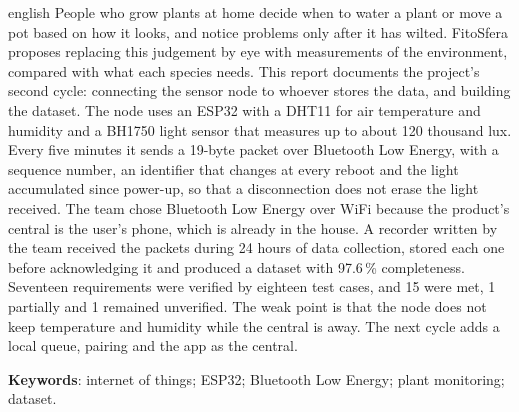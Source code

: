 \begin{resumo}[Abstract]
\begin{otherlanguage*}{english}
People who grow plants at home decide when to water a plant or move a pot
based on how it looks, and notice problems only after it has wilted.
FitoSfera proposes replacing this judgement by eye with measurements of
the environment, compared with what each species needs. This report
documents the project's second cycle: connecting the sensor node to
whoever stores the data, and building the dataset. The node uses an ESP32
with a DHT11 for air temperature and humidity and a BH1750 light sensor
that measures up to about 120 thousand lux. Every five minutes it sends a
19-byte packet over Bluetooth Low Energy, with a sequence number, an
identifier that changes at every reboot and the light accumulated since
power-up, so that a disconnection does not erase the light received. The
team chose Bluetooth Low Energy over WiFi because the product's central
is the user's phone, which is already in the house. A recorder written by
the team received the packets during 24 hours of data
collection, stored each one before acknowledging it and produced a
dataset with 97.6\,\% completeness. Seventeen requirements were
verified by eighteen test cases, and 15 were met, 1 partially and 1 remained unverified. The weak point
is that the node does not keep temperature and humidity while the central
is away. The next cycle adds a local queue, pairing and the app as the
central.

\textbf{Keywords}: internet of things; ESP32; Bluetooth Low Energy; plant
monitoring; dataset.
\end{otherlanguage*}
\end{resumo}
